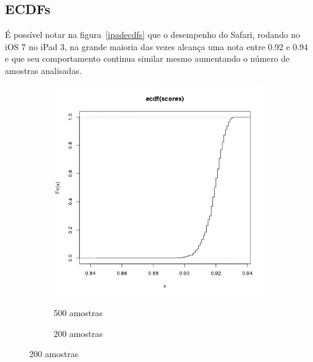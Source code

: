 \documentclass[11pt,a4paper]{article}
\begin{document}
\subsection{ECDFs}\label{ecdfs}

É possível notar na figura~\ref{ipadecdfs} que o desempenho do Safari, rodando no iOS 7 no iPad 3, na grande maioria das
vezes alcança uma nota entre 0.92 e 0.94 e que seu comportamento continua similar mesmo aumentando o número de amostras
analisadas.

\begin{figure}
    \caption{ECDFs - iPad 3 Safari}
    \label{ipadecdfs}
    \begin{subfigure}{.5\textwidth}
        \caption{500 amostras}
        \centering
        \includegraphics[width=\textwidth]{images/ecdf-ipad-3-ios7-safari-500-amostras-20131119}
        \label{safari500}
    \end{subfigure}
    \begin{subfigure}{.5\textwidth}
        \caption{200 amostras}
        \centering

\end{subfigure}
\end{figure}
\end{document}
